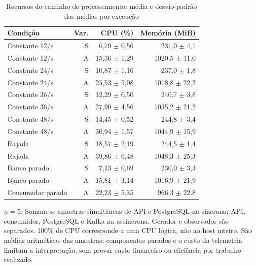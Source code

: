 \begin{table}[htbp]
\centering
\caption{Recursos do caminho de processamento: média e desvio-padrão das médias por execução}
\label{tab:final-recursos}
\small
\setlength{\tabcolsep}{4pt}
\begin{tabular}{lrrr}
\hline
Condição & Var. & CPU (\%) & Memória (MiB) \\ \hline
Constante 12/s & S & 6,79 $\pm$ 0,56 & 231,0 $\pm$ 4,1 \\
Constante 12/s & A & 15,36 $\pm$ 1,29 & 1020,5 $\pm$ 11,0 \\
Constante 24/s & S & 10,87 $\pm$ 1,16 & 237,0 $\pm$ 1,8 \\
Constante 24/s & A & 25,53 $\pm$ 5,08 & 1018,8 $\pm$ 22,2 \\
Constante 36/s & S & 12,29 $\pm$ 0,50 & 240,7 $\pm$ 3,8 \\
Constante 36/s & A & 27,90 $\pm$ 4,56 & 1035,2 $\pm$ 21,2 \\
Constante 48/s & S & 14,45 $\pm$ 0,52 & 244,8 $\pm$ 3,4 \\
Constante 48/s & A & 30,94 $\pm$ 1,57 & 1044,9 $\pm$ 15,9 \\
Rajada & S & 18,57 $\pm$ 2,19 & 244,5 $\pm$ 1,4 \\
Rajada & A & 39,86 $\pm$ 6,48 & 1048,3 $\pm$ 25,3 \\
Banco parado & S & 7,13 $\pm$ 0,69 & 230,0 $\pm$ 3,3 \\
Banco parado & A & 15,81 $\pm$ 3,14 & 1016,9 $\pm$ 21,9 \\
Consumidor parado & A & 22,23 $\pm$ 5,35 & 966,3 $\pm$ 22,8 \\
\hline
\end{tabular}
\vspace{0.2cm}
\begin{minipage}{\textwidth}
\footnotesize
$n=5$. Somam-se amostras simultâneas de API e PostgreSQL na síncrona; API, consumidor, PostgreSQL e Kafka na assíncrona. Gerador e observador são separados. 100\% de CPU corresponde a uma CPU lógica, não ao host inteiro. São médias aritméticas das amostras; componentes parados e o custo da telemetria limitam a interpretação, sem provar custo financeiro ou eficiência por trabalho realizado.
\end{minipage}
\end{table}
